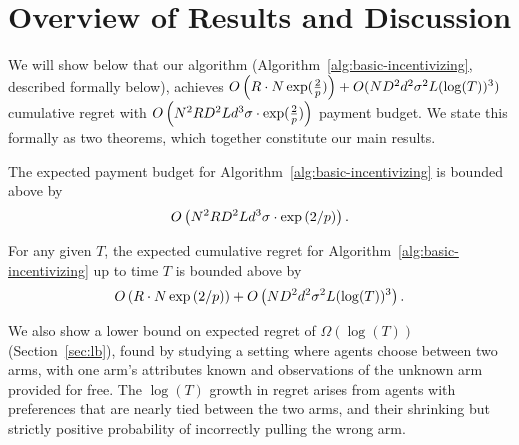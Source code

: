 \section{Overview of Results and Discussion}
%
%

We will show below that our algorithm (Algorithm~\ref{alg:basic-incentivizing}, described formally below), achieves 
$O \left(R\cdot  N\exp(\frac{2}{p})\right) + O(ND^2 d^2\sigma^2 L(\log(T))^3)$ cumulative regret with 
$O \left(N^2 R D^2 L d^3 \sigma\cdot \exp(\frac{2}{p}) \right)$ payment budget.  We state this formally as two theorems, which together constitute our main results.


\begin{theorem}
The expected payment budget for
Algorithm~\ref{alg:basic-incentivizing} is bounded above by
\begin{align}
O \left(N^2 R D^2 L d^3 \sigma\cdot \exp\left(2/p\right) \right). \nonumber 
\end{align} 
\label{rst:budget}
\end{theorem}


\begin{theorem}
For any given $T$, the expected cumulative regret for
Algorithm~\ref{alg:basic-incentivizing} up to time $T$ is bounded
above by 
\begin{align}
O \left(R\cdot  N\exp\left(2/p\right)\right) +
O\left(ND^2 d^2\sigma^2 L(\log(T))^3\right).
\end{align}
\label{rst:regret}
\end{theorem}

We also show a lower bound on expected regret of $\Omega(\log(T))$ (Section~\ref{sec:lb}), found by studying a setting where agents choose between two arms, with one arm's attributes known and observations of the unknown arm provided for free.  The $\log(T)$ growth in regret arises from agents with preferences that are nearly tied between the two arms, and their shrinking but strictly positive probability of incorrectly pulling the wrong arm.

